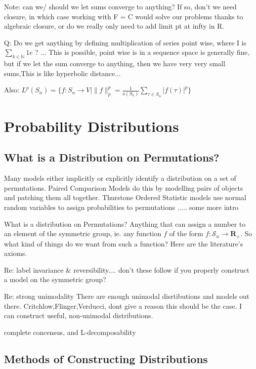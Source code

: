 \documentclass{article}
\theoremstyle{definition}
\begin{document}
Note: can we/ should we let sums converge to anything? If so, don't we need closure, in which case working with F = C would solve our problems thanks to algebraic closure, or do we really only need to add limit pt at infty in R.

Q: Do we get anything by defining multiplication of series point wise, where I is $\sum_{k\in \mathbb{N}} 1 e$ ? ... This is possible, point wise is in a sequence space is generally fine, but if we let the sum converge to anything, then we have very very small sums,This is like hyperbolic distance...

Also: \(
L^p(S_n) = \{ f:S_n \rightarrow V \mid \|f\|_p^p = \frac{1}{o(S_n)}\sum_{\tau \in S_n} |f(\tau)|^p \}
\)

\section{Probability Distributions}
\subsection{What is a Distribution on Permutations?}
Many models either implicitly or explicitly identify a distribution on a set of permutations. Paired Comparison Models do this by modelling pairs of objects and patching them all together. Thurstone Ordered Statistic models use normal random variables to assign probabilities to permutations ..... some more intro

What is a distribution on Permutations? Anything that can assign a number to an element of the symmetric group, ie. any function $f$ of the form \(f:\mathcal{S}_n \rightarrow \mathbf{R}_+ \). So what kind of things do we want from such a function? Here are the literature's axioms. 

Re: label invariance & reversibility....
    don't these follow if you properly construct a model on the symmetric group?

Re: strong unimodality
    There are enough unimodal disrtibutions and models out there. Critchlow,Flinger,Verducci, dont give a reason this should be the case. I can construct useful, non-unimodal distributions.
    
complete concensus, and L-decomposability

\subsection{Methods of Constructing Distributions}
\end{document}
